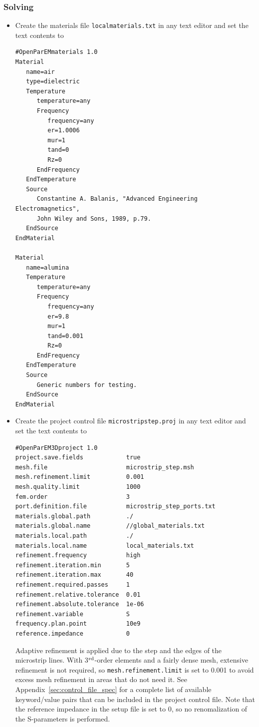 \documentclass[titlepage]{article}
\renewcommand\_{\textunderscore\linebreak[1]}
\begin{document}
\subsubsection{Solving}

\begin{itemize}

\item Create the materials file \texttt{local\_materials.txt} in any text editor and set the text contents to
\begin{Verbatim}[fontsize=\small]
#OpenParEMmaterials 1.0
Material
   name=air
   type=dielectric
   Temperature
      temperature=any
      Frequency
         frequency=any
         er=1.0006
         mur=1
         tand=0
         Rz=0
      EndFrequency
   EndTemperature
   Source
      Constantine A. Balanis, "Advanced Engineering Electromagnetics",
      John Wiley and Sons, 1989, p.79.
   EndSource
EndMaterial

Material
   name=alumina
   Temperature
      temperature=any
      Frequency
         frequency=any
         er=9.8
         mur=1
         tand=0.001
         Rz=0
      EndFrequency
   EndTemperature
   Source
      Generic numbers for testing.
   EndSource
EndMaterial
\end{Verbatim}

\item Create the project control file \texttt{microstrip\_step.proj} in any text editor and set the text contents to
\begin{Verbatim}[fontsize=\small]
#OpenParEM3Dproject 1.0
project.save.fields            true
mesh.file                      microstrip_step.msh
mesh.refinement.limit          0.001
mesh.quality.limit             1000
fem.order                      3
port.definition.file           microstrip_step_ports.txt
materials.global.path          ./
materials.global.name          //global_materials.txt
materials.local.path           ./
materials.local.name           local_materials.txt
refinement.frequency           high
refinement.iteration.min       5
refinement.iteration.max       40
refinement.required.passes     1
refinement.relative.tolerance  0.01
refinement.absolute.tolerance  1e-06
refinement.variable            S
frequency.plan.point           10e9
reference.impedance            0
\end{Verbatim}

\noindent Adaptive refinement is applied due to the step and the edges of the microstrip lines.  With 3$^{\textnormal{rd}}$-order elements and a fairly dense mesh, extensive refinement is not required, so \texttt{mesh.refinement.limit} is set to 0.001 to avoid excess mesh refinement in areas that do not need it.
See Appendix~\ref{sec:control_file_spec} for a complete list of available keyword/value pairs that can be included in the project control file. Note that the reference impedance in the setup file is set to 0, so no renomalization of the S-parameters is performed.


\end{itemize}
\end{document}
